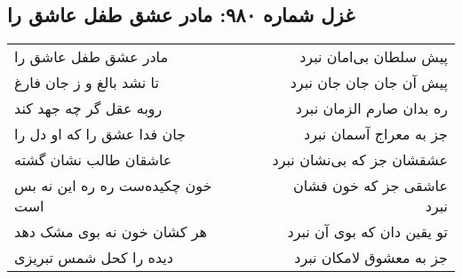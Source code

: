 \begin{center}
\section*{غزل شماره ۹۸۰: مادر عشق طفل عاشق را}
\label{sec:0980}
\begin{longtable}{l p{0.5cm} r}
مادر عشق طفل عاشق را
&&
پیش سلطان بی‌امان نبرد
\\
تا نشد بالغ و ز جان فارغ
&&
پیش آن جان جان جان نبرد
\\
روبه عقل گر چه جهد کند
&&
ره بدان صارم الزمان نبرد
\\
جان فدا عشق را که او دل را
&&
جز به معراج آسمان نبرد
\\
عاشقان طالب نشان گشته
&&
عشقشان جز که بی‌نشان نبرد
\\
خون چکیده‌ست ره ره این نه بس است
&&
عاشقی جز که خون فشان نبرد
\\
هر کشان خون نه بوی مشک دهد
&&
تو یقین دان که بوی آن نبرد
\\
دیده را کحل شمس تبریزی
&&
جز به معشوق لامکان نبرد
\\
\end{longtable}
\end{center}
